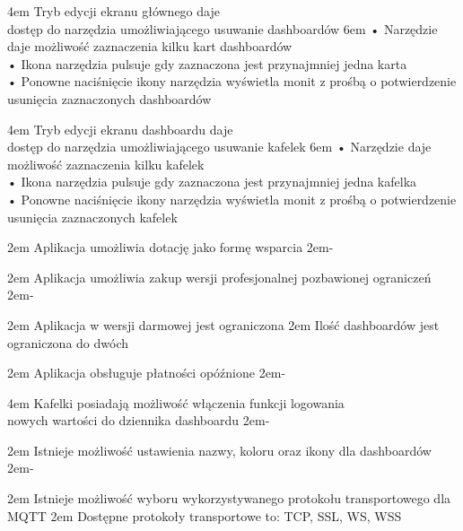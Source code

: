 {4em}{
    Tryb edycji ekranu głównego daje\\
    dostęp do narzędzia umożliwiającego usuwanie dashboardów
}
{6em}{
    • Narzędzie daje możliwość zaznaczenia kilku kart dashboardów\\
    • Ikona narzędzia pulsuje gdy zaznaczona jest przynajmniej jedna karta\\
    • Ponowne naciśnięcie ikony narzędzia wyświetla monit z prośbą o potwierdzenie\\
    \hspace*{0.5em} usunięcia zaznaczonych dashboardów
}

{4em}{
    Tryb edycji ekranu dashboardu daje\\
    dostęp do narzędzia umożliwiającego usuwanie kafelek
}
{6em}{
    • Narzędzie daje możliwość zaznaczenia kilku kafelek\\
    • Ikona narzędzia pulsuje gdy zaznaczona jest przynajmniej jedna kafelka\\
    • Ponowne naciśnięcie ikony narzędzia wyświetla monit z prośbą o potwierdzenie\\
    \hspace*{0.5em} usunięcia zaznaczonych kafelek
}

{2em}{
    Aplikacja umożliwia dotację jako formę wsparcia
}
{2em}{-}

{2em}{
    Aplikacja umożliwia zakup wersji profesjonalnej pozbawionej ograniczeń
}
{2em}{-}

{2em}{
    Aplikacja w wersji darmowej jest ograniczona
}
{2em}{
    Ilość dashboardów jest ograniczona do dwóch
}

{2em}{
    Aplikacja obsługuje płatności opóźnione
}
{2em}{-}

{4em}{
    Kafelki posiadają możliwość włączenia funkcji logowania\\
    nowych wartości do dziennika dashboardu
}
{2em}{-}

{2em}{
    Istnieje możliwość ustawienia nazwy, koloru oraz ikony dla dashboardów
}
{2em}{-}

{2em}{
    Istnieje możliwość wyboru wykorzystywanego protokołu transportowego dla MQTT
}
{2em}{
    Dostępne protokoły transportowe to: TCP, SSL, WS, WSS
}

